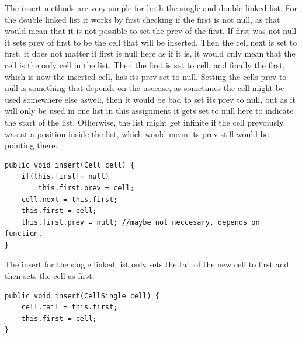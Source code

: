 \documentclass[a4paper,11pt]{article}
\begin{document}
The insert methods are very simple for both the single and double linked list. For the double linked list it works by first checking if the first is not null, as that would mean that it is not possible to set the prev of the first. If first was not null it sets 
prev of first to be the cell that will be inserted. Then the cell.next is set to first, it does not matter if first is null here as if it is, it would only mean that the cell is the only cell in the list.
Then the first is set to cell, and finally the first, which is now the inserted cell, has its prev set to null. Setting the cells prev to null is something that depends on the usecase, as sometimes the cell might 
be used somewhere else aswell, then it would be bad to set its prev to null, but as it will only be used in one list in this assignment it gets set to null here to indicate the start of the list. Otherwise, the list might get infinite if the cell prevoiusly 
was at a position inside the list, which would mean its prev still would be pointing there. 
\begin{verbatim}
public void insert(Cell cell) {
    if(this.first!= null)
        this.first.prev = cell;
    cell.next = this.first;
    this.first = cell;
    this.first.prev = null; //maybe not neccesary, depends on function.
}
\end{verbatim}
The insert for the single linked list only sets the tail of the new cell to first and then sets the cell as first.
\begin{verbatim}
public void insert(CellSingle cell) {
    cell.tail = this.first;
    this.first = cell;
}
\end{verbatim}
\end{document}
